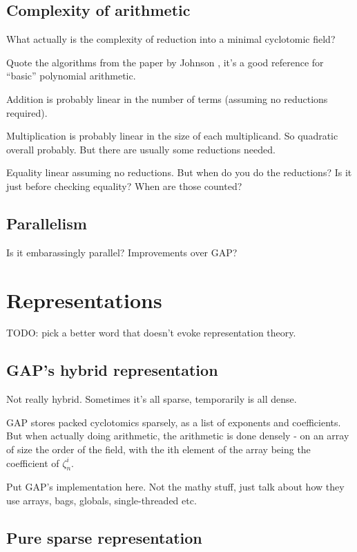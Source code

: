 \documentclass{article}
\begin{document}
\subsection{Complexity of arithmetic}

What actually is the complexity of reduction into a minimal cyclotomic
field?

Quote the algorithms from the paper by Johnson \cite{Johnson1974},
it's a good reference for ``basic'' polynomial arithmetic.

Addition is probably linear in the number of terms (assuming no
reductions required).

Multiplication is probably linear in the size of each multiplicand. So
quadratic overall probably. But there are usually some reductions
needed.

Equality linear assuming no reductions. But when do you do the
reductions? Is it just before checking equality? When are those
counted?

\subsection{Parallelism}

Is it embarassingly parallel? Improvements over GAP?

\section{Representations}

TODO: pick a better word that doesn't evoke representation theory.

\subsection{GAP's hybrid representation}

Not really hybrid. Sometimes it's all sparse, temporarily is all
dense.

GAP stores packed cyclotomics sparsely, as a list of exponents and
coefficients. But when actually doing arithmetic, the arithmetic is
done densely - on an array of size the order of the field, with the
ith element of the array being the coefficient of $\zeta_n^i$.

Put GAP's implementation here. Not the mathy stuff, just talk about
how they use arrays, bags, globals, single-threaded etc.

\subsection{Pure sparse representation}
\end{document}
